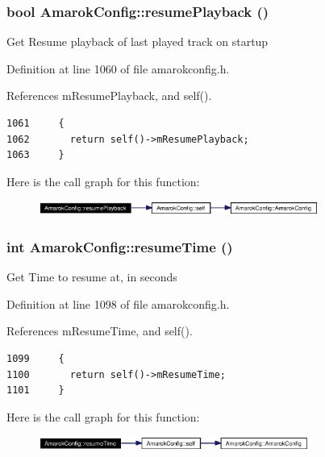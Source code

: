 \subsubsection{\setlength{\rightskip}{0pt plus 5cm}bool Amarok\-Config::resume\-Playback ()\hspace{0.3cm}{\tt  [inline, static]}}\label{classAmarokConfig_AmarokConfige110}


Get Resume playback of last played track on startup 

Definition at line 1060 of file amarokconfig.h.

References m\-Resume\-Playback, and self().



\footnotesize\begin{verbatim}1061     {
1062       return self()->mResumePlayback;
1063     }
\end{verbatim}\normalsize 


Here is the call graph for this function:\begin{figure}[H]
\begin{center}
\leavevmode
\includegraphics[width=260pt]{classAmarokConfig_AmarokConfige110_cgraph}
\end{center}
\end{figure}
\subsubsection{\setlength{\rightskip}{0pt plus 5cm}int Amarok\-Config::resume\-Time ()\hspace{0.3cm}{\tt  [inline, static]}}\label{classAmarokConfig_AmarokConfige114}


Get Time to resume at, in seconds 

Definition at line 1098 of file amarokconfig.h.

References m\-Resume\-Time, and self().



\footnotesize\begin{verbatim}1099     {
1100       return self()->mResumeTime;
1101     }
\end{verbatim}\normalsize 


Here is the call graph for this function:\begin{figure}[H]
\begin{center}
\leavevmode
\includegraphics[width=251pt]{classAmarokConfig_AmarokConfige114_cgraph}
\end{center}
\end{figure}
